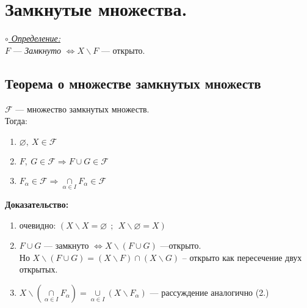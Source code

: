   \section{Замкнутые множества.}
\underline{\textit{$\circ$ Определение:}}\\
$F$ --- \emph{Замкнуто} $\Longleftrightarrow X\backslash F$ --- открыто.
\subsection{Теорема о множестве замкнутых множеств}
$ \mathcal{F} $ --- множество замкнутых множеств.
\\Тогда:
\begin{enumerate}
\item $\varnothing ,~X\in \mathcal{F}$
\item $F,~G\in \mathcal{F} \Longrightarrow F\cup G\in \mathcal{F}$
\item $F_{\alpha}\in \mathcal{F} \Longrightarrow \underset{\alpha\in I}{\cap}F_{\alpha}\in \mathcal{F}$
\end{enumerate}
 \textbf{Доказательство:}
 \begin{enumerate}
 	\item очевидно: $(X\backslash X = \varnothing~~;~~X\backslash \varnothing = X)$
 	\item $F\cup G$ --- замкнуто $\Longleftrightarrow X\backslash (F\cup G)$ ---открыто.\\
 	Но $X\backslash (F\cup G) = (X\backslash F)\cap(X\backslash G)$ -- открыто как пересечение двух открытых.
 	\item $X\backslash(\underset{\alpha\in I}{\cap}F_{\alpha}) = \underset{\alpha\in I}{\cup}(X\backslash F_{\alpha})$ --- рассуждение аналогично (2.)

\end{enumerate}
